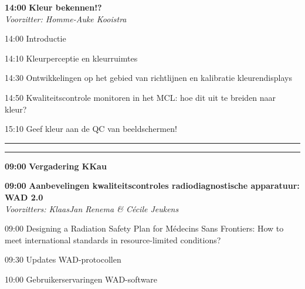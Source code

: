 \documentclass[a4paper,10pt]{report}
\begin{document}
\begin{multicols*}{3}
\begin{packed_enum}
\item[\textbf{14:00}] \textbf{Kleur bekennen!?}\\\textit{Voorzitter: Homme-Auke Kooistra}
\item[14:00] Introductie
\item[14:10] Kleurperceptie en kleurruimtes
\item[14:30] Ontwikkelingen op het gebied van richtlijnen en kalibratie kleurendisplays
\item[14:50] Kwaliteitscontrole monitoren in het MCL: hoe dit uit te breiden naar kleur?
\item[15:10] Geef kleur aan de QC van beeldschermen!
\end{packed_enum} %

\vfill


\vfill

\hrule\vspace{2mm}
\vspace{2mm}\hrule\strut


\begin{packed_enum}
\item[\textbf{09:00}] \textbf{Vergadering KKau}
\end{packed_enum} %

\vfill

\begin{packed_enum}
\item[\textbf{09:00}] \textbf{Aanbevelingen kwaliteitscontroles radiodiagnostische apparatuur: WAD 2.0}\\\textit{Voorzitters: KlaasJan Renema \& Cécile Jeukens}
\item[09:00] Designing a Radiation Safety Plan for Médecins Sans Fron\-tiers: How to meet international standards in resource-limited conditions?
\item[09:30] Updates WAD-protocollen
\item[10:00] Gebruikerservaringen WAD-software
\end{packed_enum} %


\end{multicols*}
\end{document}
